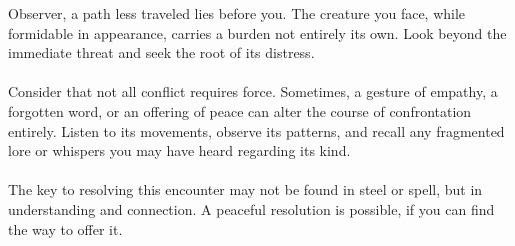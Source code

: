 \documentclass{article}
\begin{document}
\begin{infobox}
Observer, a path less traveled lies before you. The creature you face, while formidable in appearance, carries a burden not entirely its own. Look beyond the immediate threat and seek the root of its distress. \\
\\
Consider that not all conflict requires force. Sometimes, a gesture of empathy, a forgotten word, or an offering of peace can alter the course of confrontation entirely. Listen to its movements, observe its patterns, and recall any fragmented lore or whispers you may have heard regarding its kind. \\
\\
The key to resolving this encounter may not be found in steel or spell, but in understanding and connection. A peaceful resolution is possible, if you can find the way to offer it.
\end{infobox}
\end{document}
